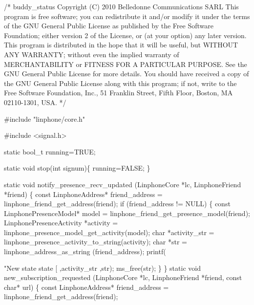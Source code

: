 \begin{DoxyCodeInclude}

\textcolor{comment}{/*}
\textcolor{comment}{buddy\_status}
\textcolor{comment}{Copyright (C) 2010  Belledonne Communications SARL}
\textcolor{comment}{}
\textcolor{comment}{This program is free software; you can redistribute it and/or}
\textcolor{comment}{modify it under the terms of the GNU General Public License}
\textcolor{comment}{as published by the Free Software Foundation; either version 2}
\textcolor{comment}{of the License, or (at your option) any later version.}
\textcolor{comment}{}
\textcolor{comment}{This program is distributed in the hope that it will be useful,}
\textcolor{comment}{but WITHOUT ANY WARRANTY; without even the implied warranty of}
\textcolor{comment}{MERCHANTABILITY or FITNESS FOR A PARTICULAR PURPOSE.  See the}
\textcolor{comment}{GNU General Public License for more details.}
\textcolor{comment}{}
\textcolor{comment}{You should have received a copy of the GNU General Public License}
\textcolor{comment}{along with this program; if not, write to the Free Software}
\textcolor{comment}{Foundation, Inc., 51 Franklin Street, Fifth Floor, Boston, MA  02110-1301, USA.}
\textcolor{comment}{*/}

\textcolor{preprocessor}{#include "linphone/core.h"}

\textcolor{preprocessor}{#include <signal.h>}

\textcolor{keyword}{static} bool\_t running=TRUE;

\textcolor{keyword}{static} \textcolor{keywordtype}{void} stop(\textcolor{keywordtype}{int} signum)\{
        running=FALSE;
\}

\textcolor{keyword}{static} \textcolor{keywordtype}{void} notify\_presence\_recv\_updated (LinphoneCore *lc,  LinphoneFriend *\textcolor{keyword}{friend}) \{
        \textcolor{keyword}{const} LinphoneAddress* friend\_address = linphone_friend_get_address(\textcolor{keyword}{friend});
        \textcolor{keywordflow}{if} (friend\_address != NULL) \{
                \textcolor{keyword}{const} LinphonePresenceModel* model = 
      linphone_friend_get_presence_model(\textcolor{keyword}{friend});
                LinphonePresenceActivity *activity = 
      linphone_presence_model_get_activity(model);
                \textcolor{keywordtype}{char} *activity\_str = linphone_presence_activity_to_string(activity);
                \textcolor{keywordtype}{char} *str = linphone_address_as_string (friend\_address);
                printf(\textcolor{stringliteral}{"New state state [%
                                        ,activity\_str
                                        ,str);
                ms\_free(str);
        \}
\}
\textcolor{keyword}{static} \textcolor{keywordtype}{void} new\_subscription\_requested (LinphoneCore *lc,  LinphoneFriend *\textcolor{keyword}{friend}, \textcolor{keyword}{const} \textcolor{keywordtype}{char}* url) \{
        \textcolor{keyword}{const} LinphoneAddress* friend\_address = linphone_friend_get_address(\textcolor{keyword}{friend});

}
\end{DoxyCodeInclude}
